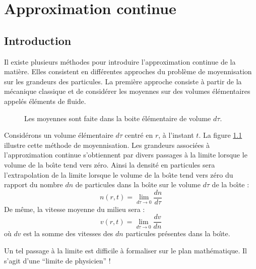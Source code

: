 \documentclass[12pt]{book}
\begin{document}
\chapter{Approximation continue}\label{chapapproxconti}
\section{Introduction}
Il existe plusieurs m\'ethodes pour introduire l'approximation
continue de la mati\`ere. Elles consistent en diff\'erentes approches du
probl\`eme de moyennisation sur les grandeurs des particules.
La premi\`ere approche consiste \`a partir de la m\'ecanique classique
et de consid\'erer les moyennes sur des volumes \'el\'ementaires
appel\'es \'el\'ements de fluide.
\begin{figure}[htb]
 \centerline{}   
 \caption{Les moyennes sont faite dans la boite \'el\'ementaire de
volume $d\tau$.}
 \label{figvolele}
\end{figure}
Consid\'erons un volume \'el\'ementaire $d\tau$ centr\'e en $r$, \`a
l'instant $t$. La figure \ref{figvolele} illustre cette m\'ethode de
moyennisation. Les grandeurs associ\'ees \`a l'approximation continue
s'obtiennent par divers passages \`a la limite lorsque le volume de la
bo\^\i te tend vers z\'ero. 
Ainsi la densit\'e en particules sera l'extrapolation de la limite
lorsque le volume de la bo\^\i te tend vers z\'ero du rapport du
nombre $dn$ de particules dans la bo\^\i te sur le volume $d\tau$ de la 
bo\^\i te :
\begin{equation}
n(r,t)=\lim_{d\tau\rightarrow 0}\frac{dn}{d\tau}
\end{equation}
De m\^eme, la vitesse moyenne du milieu sera :
\begin{equation}
v(r,t)=\lim_{d\tau\rightarrow 0}\frac{dv}{dn}
\end{equation}
o\`u $dv$ est la somme des vitesses des $dn$ particules pr\'esentes
dans la bo\^\i te.
\begin{rem}
Un tel passage \`a la limite est difficile \`a formaliser sur le plan
math\'ematique. Il s'agit d'une ``limite de physicien'' ! 
\end{rem}
\end{document}

